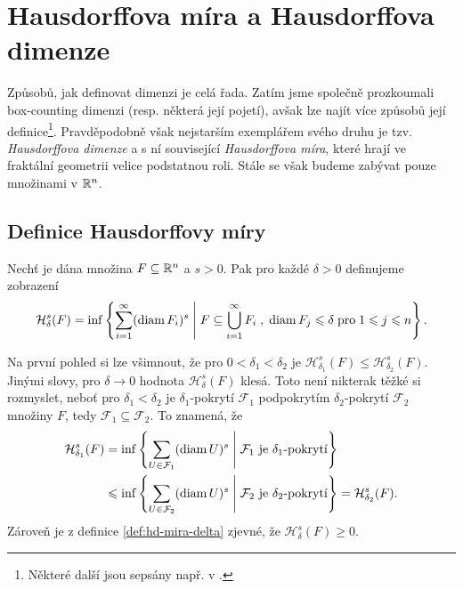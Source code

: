 \section{Hausdorffova míra a Hausdorffova dimenze}\label{sec:hausdorffova-mira-dimenze}

Způsobů, jak definovat dimenzi je celá řada. Zatím jsme společně prozkoumali box-counting dimenzi (resp. některá její pojetí), avšak lze najít více způsobů její definice\footnote{Některé další jsou sepsány např. v \citep[str. 40]{Falconer2014}.}. Pravděpodobně však nejstarším exemplářem svého druhu je tzv. \emph{Hausdorffova dimenze} a s ní související \emph{Hausdorffova míra}, které hrají ve fraktální geometrii velice podstatnou roli. Stále se však budeme zabývat pouze množinami v $\mathbb{R}^n$.

\subsection{Definice Hausdorffovy míry}\label{subsec:hd-mira-definice}

\begin{definition}\label{def:hd-mira-delta}
    Nechť je dána množina $F\subseteq\mathbb{R}^n$ a $s>0$. Pak pro každé $\delta>0$ definujeme zobrazení
    \[\mathcal{H}_\delta^s(F)=\inf\left\{\sum_{i=1}^{\infty}(\operatorname{diam}{F_i})^s\;\middle|\;F\subseteq\bigcup_{i=1}^\infty F_i\;,\;\operatorname{diam}{F_j}\leqslant\delta\;\text{pro}\;1\leqslant j\leqslant n\right\}.\]
\end{definition}
Na první pohled si lze všimnout, že pro $0<\delta_1<\delta_2$ je $\mathcal{H}_{\delta_1}^s(F)\leqslant\mathcal{H}_{\delta_2}^s(F)$. Jinými slovy, pro $\delta\to 0$ hodnota $\mathcal{H}_\delta^s(F)$ klesá. Toto není nikterak těžké si rozmyslet, neboť pro $\delta_1<\delta_2$ je $\delta_1$-pokrytí $\mathcal{F}_1$ podpokrytím $\delta_2$-pokrytí $\mathcal{F}_2$ množiny $F$, tedy $\mathcal{F}_1\subseteq\mathcal{F}_2$. To znamená, že
\begin{align*}
    \mathcal{H}_{\delta_1}^s(F)&=\inf\left\{\sum_{U\in\mathcal{F}_1}(\operatorname{diam}{U})^s\;\middle|\;\text{$\mathcal{F}_1$ je $\delta_1$-pokrytí}\right\}\\
    &\leqslant\inf\left\{\sum_{U\in\mathcal{F}_2}(\operatorname{diam}{U})^s\;\middle|\;\text{$\mathcal{F}_2$ je $\delta_2$-pokrytí}\right\}=\mathcal{H}_{\delta_2}^s(F).
\end{align*}
Zároveň je z definice \ref{def:hd-mira-delta} zjevné, že $\mathcal{H}_\delta^s(F)\geqslant 0$.

